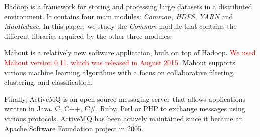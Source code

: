 \documentclass[times, doublespace]{smrauth}
\newcommand{\red}[1]{\textcolor{red}{#1}}
\begin{document}
{Hadoop \cite{hadoop2011hadoop} is a framework for storing and processing large datasets in a distributed environment. It contains four main modules: {\it Common}, {\it HDFS}, {\it YARN} and {\it MapReduce}. In this paper, we study the {\it Common} module that contains the different libraries required by the other three modules.

Mahout \cite{mahout2012scalable} is a relatively new software application, built on top of Hadoop. \red{We used Mahout version 0.11, which was released in August 2015.}
Mahout supports various machine learning algorithms with a focus on collaborative filtering, clustering, and classification.

Finally, ActiveMQ \cite{snyder2011activemq} is an open source messaging server that allows applications written in Java, C, C++, C\#, Ruby, Perl or PHP to exchange messages using various protocols. ActiveMQ has  been actively maintained since it became an Apache Software Foundation project in 2005.


}
\end{document}
